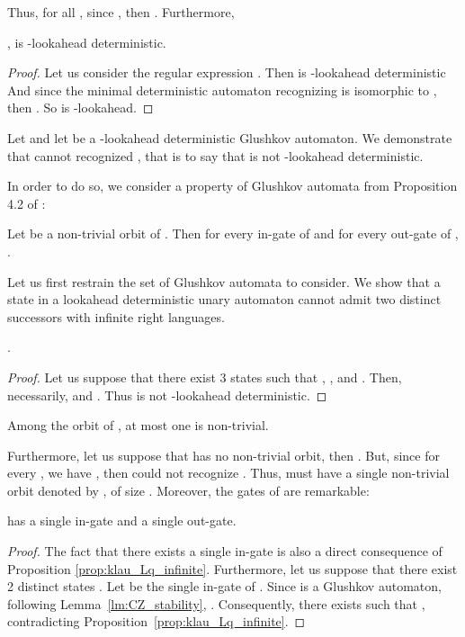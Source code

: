 \documentclass{llncs}
\begin{document}
Thus, for all , since , then .
Furthermore,

\begin{proposition}\label{prop:Aj_jp1_ld}
	,  is -lookahead deterministic.
\end{proposition}
\begin{proof}
	Let us consider the regular expression .
	Then  is -lookahead deterministic
	And since the minimal deterministic automaton recognizing  is isomorphic to , then .
	So  is -lookahead.
\end{proof}


	Let  and let  be a -lookahead deterministic Glushkov automaton.
	We demonstrate that  cannot recognized , that is to say that  is not -lookahead deterministic.
 
	In order to do so, we consider a property of Glushkov automata from Proposition 4.2 of \cite{CZ97}:
\begin{lemma}\label{lm:CZ_stability}
	Let  be a non-trivial orbit of .
	Then for every in-gate  of  and for every out-gate  of , .
\end{lemma}

	Let us first restrain the set of Glushkov automata to consider.
	We show that a state in a lookahead deterministic unary automaton cannot admit two distinct successors with infinite right languages.

\begin{proposition}\label{prop:klau_Lq_infinite}
	.
\end{proposition}
\begin{proof}
	Let us suppose that there exist 3 states  such that , ,  and .
	Then, necessarily,  and .
	Thus  is not -lookahead deterministic.
\end{proof}

\begin{corollary}\label{prop:klau_orbite_non_triviale}
	Among the orbit of , at most one is non-trivial.
\end{corollary}

	Furthermore, let us suppose that  has no non-trivial orbit, then .
But, since for every , we have , then  could not recognize .
Thus,  must have a single non-trivial orbit denoted by , of size .
Moreover, the gates of  are remarkable:

\begin{proposition}\label{prop:klau_portes_uniques}
	 has a single in-gate and a single out-gate.
\end{proposition}
\begin{proof}
	The fact that there exists a single in-gate is also a direct consequence of Proposition \ref{prop:klau_Lq_infinite}.
	Furthermore, let us suppose that there exist 2 distinct states .
	Let  be the single in-gate of .
	Since  is a Glushkov automaton, following Lemma~\ref{lm:CZ_stability}, .
	Consequently, there exists  such that , contradicting Proposition~\ref{prop:klau_Lq_infinite}.
\end{proof}
\end{document}
